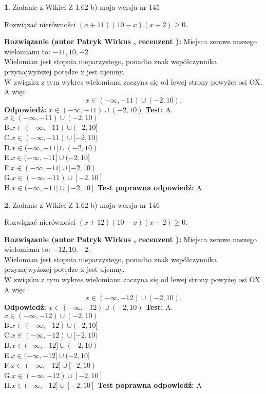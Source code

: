 \documentclass[12pt, a4paper]{article}
\theoremstyle{definition} %
\newtheorem{zad}{}
\newcommand{\zadStart}[1]{\begin{zad}#1\newline}
\newcommand{\zadStop}{\end{zad}}
\newcommand{\rozwStart}[2]{\noindent \textbf{Rozwiązanie (autor #1 , recenzent #2): }\newline}
\newcommand{\rozwStop}{\newline}
\newcommand{\odpStart}{\noindent \textbf{Odpowiedź:}\newline}
\newcommand{\odpStop}{\newline}
\newcommand{\testStart}{\noindent \textbf{Test:}\newline}
\newcommand{\testStop}{\newline}
\newcommand{\kluczStart}{\noindent \textbf{Test poprawna odpowiedź:}\newline}
\newcommand{\kluczStop}{\newline}
\begin{document}
\zadStart{Zadanie z Wikieł Z 1.62 b) moja wersja nr 145}

Rozwiązać nierówności $(x+11)(10-x)(x+2)\ge0$.
\zadStop
\rozwStart{Patryk Wirkus}{}
Miejsca zerowe naszego wielomianu to: $-11, 10, -2$.\\
Wielomian jest stopnia nieparzystego, ponadto znak współczynnika przy\linebreak najwyższej potędze x jest ujemny.\\ W związku z tym wykres wielomianu zaczyna się od lewej strony powyżej osi OX. A więc $$x \in (-\infty,-11) \cup (-2,10).$$
\rozwStop
\odpStart
$x \in (-\infty,-11) \cup (-2,10)$
\odpStop
\testStart
A.$x \in (-\infty,-11) \cup (-2,10)$\\
B.$x \in (-\infty,-11) \cup (-2,10]$\\
C.$x \in (-\infty,-11) \cup [-2,10)$\\
D.$x \in (-\infty,-11] \cup (-2,10)$\\
E.$x \in (-\infty,-11] \cup (-2,10]$\\
F.$x \in (-\infty,-11] \cup [-2,10)$\\
G.$x \in (-\infty,-11) \cup [-2,10]$\\
H.$x \in (-\infty,-11] \cup [-2,10]$
\testStop
\kluczStart
A
\kluczStop



\zadStart{Zadanie z Wikieł Z 1.62 b) moja wersja nr 146}

Rozwiązać nierówności $(x+12)(10-x)(x+2)\ge0$.
\zadStop
\rozwStart{Patryk Wirkus}{}
Miejsca zerowe naszego wielomianu to: $-12, 10, -2$.\\
Wielomian jest stopnia nieparzystego, ponadto znak współczynnika przy\linebreak najwyższej potędze x jest ujemny.\\ W związku z tym wykres wielomianu zaczyna się od lewej strony powyżej osi OX. A więc $$x \in (-\infty,-12) \cup (-2,10).$$
\rozwStop
\odpStart
$x \in (-\infty,-12) \cup (-2,10)$
\odpStop
\testStart
A.$x \in (-\infty,-12) \cup (-2,10)$\\
B.$x \in (-\infty,-12) \cup (-2,10]$\\
C.$x \in (-\infty,-12) \cup [-2,10)$\\
D.$x \in (-\infty,-12] \cup (-2,10)$\\
E.$x \in (-\infty,-12] \cup (-2,10]$\\
F.$x \in (-\infty,-12] \cup [-2,10)$\\
G.$x \in (-\infty,-12) \cup [-2,10]$\\
H.$x \in (-\infty,-12] \cup [-2,10]$
\testStop
\kluczStart
A
\kluczStop
\end{document}
